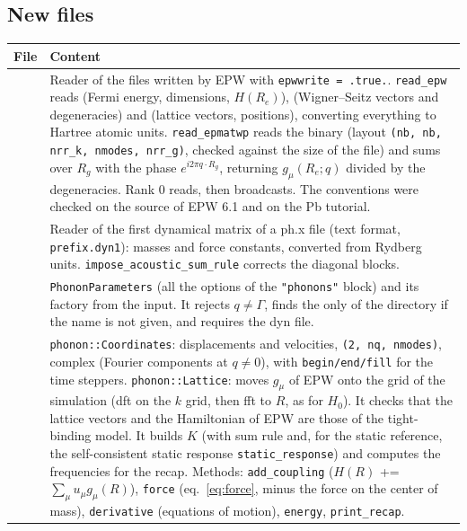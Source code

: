 \documentclass[11pt]{article}
\begin{document}
\subsection{New files}
\begin{center}
\small
\begin{tabularx}{\textwidth}{@{}>{\raggedright\arraybackslash}p{4.6cm}L@{}}
\toprule
File & Content \\
\midrule
{} &
Reader of the files written by EPW with \texttt{epwwrite = .true.}. \texttt{read\_epw} reads 
(Fermi energy, dimensions, $H(R_e)$),  (Wigner--Seitz vectors and degeneracies) and
 (lattice vectors, positions), converting everything to Hartree atomic units.
\texttt{read\_epmatwp} reads the binary  (layout \texttt{(nb, nb, nrr\_k, nmodes, nrr\_g)}, checked
against the size of the file) and sums over $R_g$ with the phase $e^{i2\pi q\cdot R_g}$, returning
$g_\mu(R_e;q)$ divided by the degeneracies. Rank 0 reads, then broadcasts. The conventions were checked on the source
of EPW 6.1 and on the Pb tutorial. \\[2pt]
 &
Reader of the first dynamical matrix of a ph.x file (text format, \texttt{prefix.dyn1}): masses and force constants,
converted from Rydberg units. \texttt{impose\_acoustic\_sum\_rule} corrects the diagonal blocks. \\[2pt]
 &
\texttt{PhononParameters} (all the options of the \texttt{"phonons"} block) and its factory from the input. It rejects
$q\neq\Gamma$, finds the only  of the directory if the name is not given, and requires the dyn file. \\[2pt]
 &
\texttt{phonon::Coordinates}: displacements and velocities, \texttt{(2, nq, nmodes)}, complex (Fourier components at
$q\neq0$), with \texttt{begin/end/fill} for the time steppers.
\texttt{phonon::Lattice}: moves $g_\mu$ of EPW onto the grid of the simulation (dft on the $k$ grid, then fft to $R$, as
for $H_0$). It checks that the lattice vectors and the Hamiltonian of EPW are those of the tight-binding model. It builds
$K$ (with sum rule and, for the static reference, the self-consistent static response \texttt{static\_response}) and
computes the frequencies for the recap. Methods:
\texttt{add\_coupling} ($H(R)$ += $\sum_\mu u_\mu g_\mu(R)$), \texttt{force} (eq.~\ref{eq:force}, minus the force on the
center of mass), \texttt{derivative} (equations of motion), \texttt{energy}, \texttt{print\_recap}. \\[2pt]

\end{tabularx}
\end{center}
\end{document}
